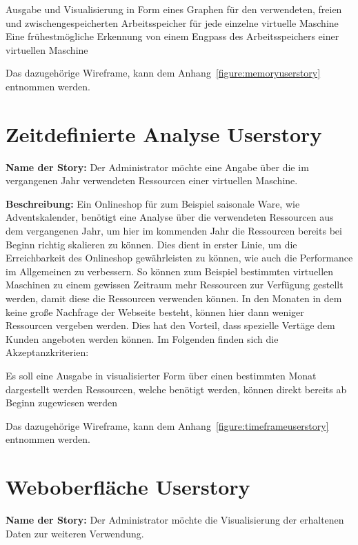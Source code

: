 \begin{outline}
  \1 Ausgabe und Visualisierung in Form eines Graphen für den verwendeten,
  freien und zwischengespeicherten Arbeitsspeicher für jede einzelne virtuelle
  Maschine
  \1 Eine frühestmögliche Erkennung von einem Engpass des Arbeitsspeichers
  einer virtuellen Maschine
\end{outline}

Das dazugehörige Wireframe, kann dem Anhang~\ref{figure:memoryuserstory}
entnommen werden.
\mr%

\section{Zeitdefinierte Analyse Userstory}
\textbf{Name der Story:} Der Administrator möchte eine Angabe über die im
vergangenen Jahr verwendeten Ressourcen einer virtuellen Maschine.

\textbf{Beschreibung:} Ein Onlineshop für zum Beispiel saisonale Ware, wie
Adventskalender, benötigt eine Analyse über die verwendeten Ressourcen aus dem
vergangenen Jahr, um hier im kommenden Jahr die Ressourcen bereits bei Beginn
richtig skalieren zu können. Dies dient in erster Linie, um die Erreichbarkeit
des Onlineshop gewährleisten zu können, wie auch die Performance im Allgemeinen
zu verbessern. So können zum Beispiel bestimmten virtuellen Maschinen zu einem
gewissen Zeitraum mehr Ressourcen zur Verfügung gestellt werden, damit diese
die Ressourcen verwenden können. In den Monaten in dem keine große Nachfrage
der Webseite besteht, können hier dann weniger Ressourcen vergeben werden. Dies
hat den Vorteil, dass spezielle Vertäge dem Kunden angeboten werden können. Im
Folgenden finden sich die Akzeptanzkriterien:

\begin{outline}
  \1 Es soll eine Ausgabe in visualisierter Form über einen bestimmten Monat
  dargestellt werden
  \1 Ressourcen, welche benötigt werden, können direkt bereits ab Beginn
  zugewiesen werden
\end{outline}

Das dazugehörige Wireframe, kann dem Anhang~\ref{figure:timeframeuserstory}
entnommen werden.
\mr%

\section{Weboberfläche Userstory}
\textbf{Name der Story:} Der Administrator möchte die Visualisierung der
erhaltenen Daten zur weiteren Verwendung.

